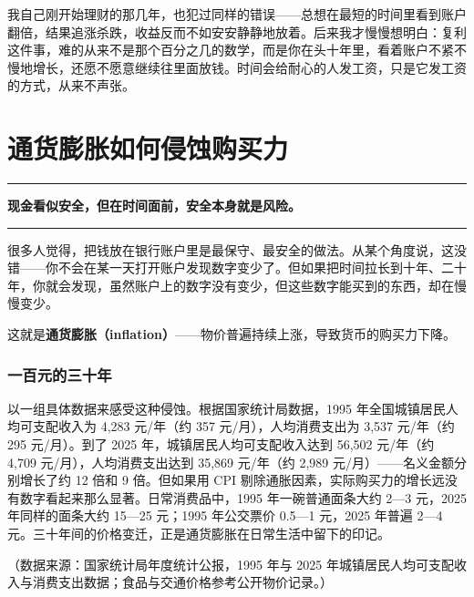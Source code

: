 \documentclass[a4paper,11pt,oneside,fontset=none,UTF8,zihao=-4]{ctexbook}
\begin{document}
我自己刚开始理财的那几年，也犯过同样的错误------总想在最短的时间里看到账户翻倍，结果追涨杀跌，收益反而不如安安静静地放着。后来我才慢慢想明白：复利这件事，难的从来不是那个百分之几的数学，而是你在头十年里，看着账户不紧不慢地增长，还愿不愿意继续往里面放钱。时间会给耐心的人发工资，只是它发工资的方式，从来不声张。

\newpage

\chapter{通货膨胀如何侵蚀购买力}\label{ux901aux8d27ux81a8ux80c0ux5982ux4f55ux4fb5ux8680ux8d2dux4e70ux529b}

\begin{center}{\color{dh-bronze}\rule{0.2\textwidth}{0.5pt}}\end{center}

\begin{dhquote}
\textbf{现金看似安全，但在时间面前，安全本身就是风险。}
\end{dhquote}

\begin{center}{\color{dh-bronze}\rule{0.2\textwidth}{0.5pt}}\end{center}

很多人觉得，把钱放在银行账户里是最保守、最安全的做法。从某个角度说，这没错------你不会在某一天打开账户发现数字变少了。但如果把时间拉长到十年、二十年，你就会发现，虽然账户上的数字没有变少，但这些数字能买到的东西，却在慢慢变少。

这就是\textbf{通货膨胀（inflation）}------物价普遍持续上涨，导致货币的购买力下降。

\subsection{一百元的三十年}\label{ux4e00ux767eux5143ux7684ux4e09ux5341ux5e74}

以一组具体数据来感受这种侵蚀。根据国家统计局数据，1995
年全国城镇居民人均可支配收入为 4,283 元/年（约 357
元/月），人均消费支出为 3,537 元/年（约 295 元/月）。到了 2025
年，城镇居民人均可支配收入达到 56,502 元/年（约 4,709
元/月），人均消费支出达到 35,869 元/年（约 2,989
元/月）------名义金额分别增长了约 12 倍和 9 倍。但如果用 CPI
剔除通胀因素，实际购买力的增长远没有数字看起来那么显著。日常消费品中，1995
年一碗普通面条大约 2---3 元，2025 年同样的面条大约 15---25 元；1995
年公交票价 0.5---1 元，2025 年普遍 2---4
元。三十年间的价格变迁，正是通货膨胀在日常生活中留下的印记。

（数据来源：国家统计局年度统计公报，1995 年与 2025
年城镇居民人均可支配收入与消费支出数据；食品与交通价格参考公开物价记录。）
\end{document}
